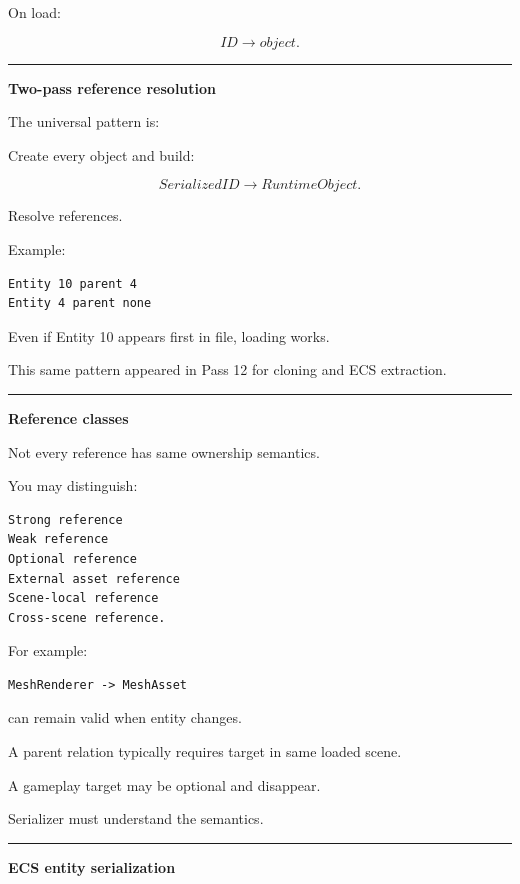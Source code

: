 On load:

\[
ID\rightarrow object.
\]

\begin{center}\rule{0.5\linewidth}{0.5pt}\end{center}

\textbf{Two-pass reference resolution}

The universal pattern is:

Create every object and build:

\[
SerializedID
\rightarrow
RuntimeObject.
\]

Resolve references.

Example:

\begin{verbatim}
Entity 10 parent 4
Entity 4 parent none
\end{verbatim}

Even if Entity 10 appears first in file, loading works.

This same pattern appeared in Pass 12 for cloning and ECS extraction.

\begin{center}\rule{0.5\linewidth}{0.5pt}\end{center}

\textbf{Reference classes}

Not every reference has same ownership semantics.

You may distinguish:

\begin{verbatim}
Strong reference
Weak reference
Optional reference
External asset reference
Scene-local reference
Cross-scene reference.
\end{verbatim}

For example:

\begin{verbatim}
MeshRenderer -> MeshAsset
\end{verbatim}

can remain valid when entity changes.

A parent relation typically requires target in same loaded scene.

A gameplay target may be optional and disappear.

Serializer must understand the semantics.

\begin{center}\rule{0.5\linewidth}{0.5pt}\end{center}

\textbf{ECS entity serialization}

